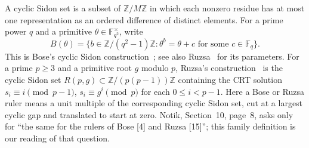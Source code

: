 \documentclass[11pt,a4paper]{article}
\newcommand{\Z}{\mathbb Z}
\begin{document}
A cyclic Sidon set is a subset of $\Z/M\Z$ in which each nonzero
residue has at most one representation as an ordered difference of
distinct elements. For a prime power $q$ and a primitive
$\theta\in\mathbb F_{q^2}^{\times}$, write
\[
 B(\theta)=\{b\in\Z/(q^2-1)\Z:\theta^b=\theta+c
                  \text{ for some }c\in\mathbb F_q\}.
\]
This is Bose's cyclic Sidon construction~\cite[pp.~1--15]{bose};
see also Ruzsa~\cite[p.~267]{ruzsa} for its parameters.
For a prime $p\ge3$ and a primitive root $g$ modulo $p$, Ruzsa's
construction~\cite[Theorem~4.4 and its proof, pp.~267--268]{ruzsa}
is the cyclic Sidon set $R(p,g)\subset\Z/(p(p-1))\Z$ containing
the CRT solution $s_i\equiv i\pmod{p-1}$,
$s_i\equiv g^i\pmod p$ for each $0\le i<p-1$.
Here a Bose or Ruzsa ruler means a unit multiple of the corresponding
cyclic Sidon set, cut at a largest cyclic gap and translated to start at
zero. Notik, Section~10, page~8, asks only for
``the same for the rulers of Bose [4] and Ruzsa [15]'';
this family definition is our reading of that question.
\end{document}
